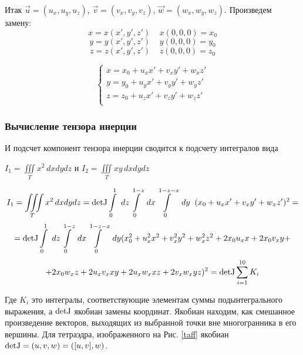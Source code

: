 \documentclass[a4paper,12pt, titlepage]{article}
\begin{document}
Итак $\vec u = ({u}_{x},{u}_{y},{u}_{z})$, $\vec v = ({v}_{x},{v}_{y},{v}_{z})$, $\vec w = ({w}_{x},{w}_{y},{w}_{z})$.
Произведем замену:
$$x = x(x',y',z')\;\;\;\;x(0,0,0) = x_0$$
$$y = y(x',y',z')\;\;\;\;y(0,0,0) = y_0$$
$$z = z(x',y',z')\;\;\;\;z(0,0,0) = z_0$$

\[
 	\left\{
 		\begin{aligned}
			x = x_0 + u_x x' + v_x y' + w_x z'\\
			y = y_0 + u_y x' + v_y y' + w_y z'\\
			z = z_0 + u_z x' + v_z y' + w_z z'\\
		\end{aligned}
	\right.
\]

\subsubsection{Вычисление тензора инерции}
И подсчет компонент тензора инерции сводится к подсчету интегралов вида 

\begin{center}
$I_{1} = \iiint \limits_T {x}^2 \,dxdydz $ 
и
$
I_{2} = \iiint \limits_T xy \,dxdydz
$
\end{center}

$$
I_{1} = \iiint \limits_T {x}^2 \,dxdydz 
= {\rm detJ} \int \limits_{0}^{1}~dz \int \limits_{0}^{1-z}~dx \int \limits_{0}^{1-z-x}~dy\;\;(x_0 + u_x x' + v_x y' + w_x z')^2 =$$
$$
= {\rm detJ} \int \limits_{0}^{1}~dz \int \limits_{0}^{1-z}~dx \int \limits_{0}^{1-z-x}~dy
(x_0^2 + u_x^2 x^2 + v_x^2 y^2 + w_x^2 z^2 + 2x_0 u_x x + 2 x_0 v_x y +$$
$$+  2 x_0 w_x z + 2 u_x v_x xy 
+ 2u_x w_x xz + 2v_x w_x yz)^2 = {\rm detJ} \sum \limits_{i = 1}^{10} K_i$$

Где $K_i$ это интегралы, соответствующие элементам суммы подынтегрального выражения, а ${\rm detJ}$ якобиан замены координат.
Якобиан находим, как смешанное произведение векторов, выходящих из выбранной точки вне многогранника в его вершины. Для тетраэдра,
изображенного на Рис. \ref{taff} якобиан ${\rm detJ} = (u,v,w) = ([u,v],w)$.
\end{document}
